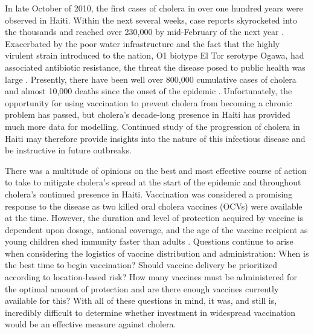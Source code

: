\documentclass[12pt]{article}
\begin{document}
  In late October of 2010, the first cases of cholera in over one hundred years were observed in Haiti. Within the next several weeks, case reports skyrocketed into the thousands and reached over 230,000 by mid-February of the next year \cite{zaro, chao}. Exacerbated by the poor water infrastructure and the fact that the highly virulent strain introduced to the nation, O1 biotype El Tor serotype Ogawa, had associated antibiotic resistance, the threat the disease posed to public health was large \cite{zaro}. Presently, there have been well over 800,000 cumulative cases of cholera and almost 10,000 deaths since the onset of the epidemic \cite{Lee_haiticholera}. Unfortunately, the opportunity for using vaccination to prevent cholera from becoming a chronic problem has passed, but cholera's decade-long presence in Haiti has provided much more data for modelling. Continued study of the progression of cholera in Haiti may therefore provide insights into the nature of this infectious disease and be instructive in future outbreaks.
  
  There was a multitude of opinions on the best and most effective course of action to take to mitigate cholera's spread at the start of the epidemic and throughout cholera's continued presence in Haiti. Vaccination was considered a promising response to the disease as two killed oral cholera vaccines (OCVs) were available at the time. However, the duration and level of protection acquired by vaccine is dependent upon dosage, national coverage, and the age of the vaccine recipient as young children shed immunity faster than adults \cite{chao}. Questions continue to arise when considering the logistics of vaccine distribution and administration: When is the best time to begin vaccination? Should vaccine delivery be prioritized according to location-based risk? How many vaccines must be administered for the optimal amount of protection and are there enough vaccines currently available for this? With all of these questions in mind, it was, and still is, incredibly difficult to determine whether investment in widespread vaccination would be an effective measure against cholera.
  
\end{document}

